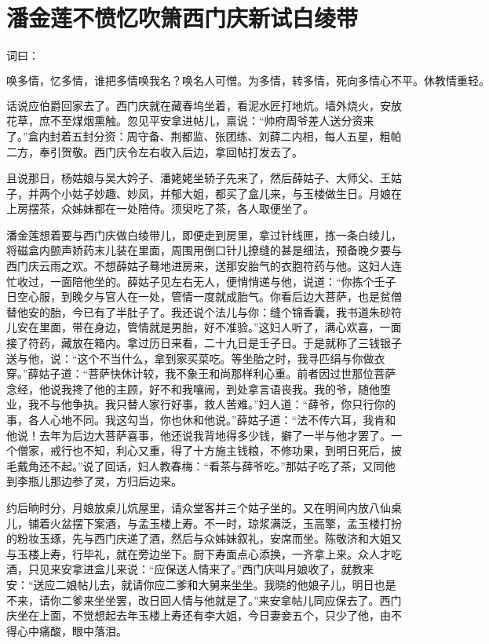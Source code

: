 

\chapter{潘金莲不愤忆吹箫\KG 西门庆新试白绫带}


词曰：

\[
唤多情，忆多情，谁把多情唤我名？唤名人可憎。为多情，转多情，死向多情心不平。休教情重轻。
\]

话说应伯爵回家去了。西门庆就在藏春坞坐着，看泥水匠打地炕。墙外烧火，安放花草，庶不至煤烟熏触。忽见平安拿进帖儿，禀说：“帅府周爷差人送分资来了。”盒内封着五封分资：周守备、荆都监、张团练、刘薛二内相，每人五星，粗帕二方，奉引贺敬。西门庆令左右收入后边，拿回帖打发去了。

且说那日，杨姑娘与吴大妗子、潘姥姥坐轿子先来了，然后薛姑子、大师父、王姑子，并两个小姑子妙趣、妙凤，并郁大姐，都买了盒儿来，与玉楼做生日。月娘在上房摆茶，众姊妹都在一处陪侍。须臾吃了茶，各人取便坐了。

潘金莲想着要与西门庆做白绫带儿，即便走到房里，拿过针线匣，拣一条白绫儿，将磁盒内颤声娇药末儿装在里面，周围用倒口针儿撩缝的甚是细法，预备晚夕要与西门庆云雨之欢。不想薛姑子蓦地进房来，送那安胎气的衣胞符药与他。这妇人连忙收过，一面陪他坐的。薛姑子见左右无人，便悄悄递与他，说道：“你拣个壬子日空心服，到晚夕与官人在一处，管情一度就成胎气。你看后边大菩萨，也是贫僧替他安的胎，今已有了半肚子了。我还说个法儿与你：缝个锦香囊，我书道朱砂符儿安在里面，带在身边，管情就是男胎，好不准验。”这妇人听了，满心欢喜，一面接了符药，藏放在箱内。拿过历日来看，二十九日是壬子日。于是就称了三钱银子送与他，说：“这个不当什么，拿到家买菜吃。等坐胎之时，我寻匹绢与你做衣穿。”薛姑子道：“菩萨快休计较，我不象王和尚那样利心重。前者因过世那位菩萨念经，他说我搀了他的主顾，好不和我嚷闹，到处拿言语丧我。我的爷，随他堕业，我不与他争执。我只替人家行好事，救人苦难。”妇人道：“薛爷，你只行你的事，各人心地不同。我这勾当，你也休和他说。”薛姑子道：“法不传六耳，我肯和他说！去年为后边大菩萨喜事，他还说我背地得多少钱，擗了一半与他才罢了。一个僧家，戒行也不知，利心又重，得了十方施主钱粮，不修功果，到明日死后，披毛戴角还不起。”说了回话，妇人教春梅：“看茶与薛爷吃。”那姑子吃了茶，又同他到李瓶儿那边参了灵，方归后边来。

约后晌时分，月娘放桌儿炕屋里，请众堂客并三个姑子坐的。又在明间内放八仙桌儿，铺着火盆摆下案酒，与孟玉楼上寿。不一时，琼浆满泛，玉高擎，孟玉楼打扮的粉妆玉琢，先与西门庆递了酒，然后与众姊妹叙礼，安席而坐。陈敬济和大姐又与玉楼上寿，行毕礼，就在旁边坐下。厨下寿面点心添换，一齐拿上来。众人才吃酒，只见来安拿进盒儿来说：“应保送人情来了。”西门庆叫月娘收了，就教来安：“送应二娘帖儿去，就请你应二爹和大舅来坐坐。我晓的他娘子儿，明日也是不来，请你二爹来坐坐罢，改日回人情与他就是了。”来安拿帖儿同应保去了。西门庆坐在上面，不觉想起去年玉楼上寿还有李大姐，今日妻妾五个，只少了他，由不得心中痛酸，眼中落泪。

